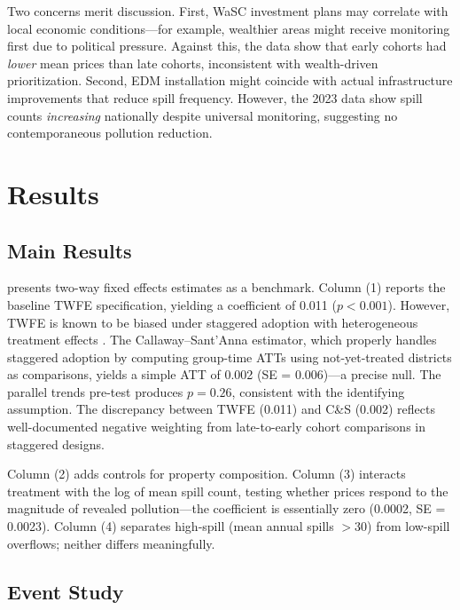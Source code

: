 \documentclass[12pt]{article}
\begin{document}
Two concerns merit discussion. First, WaSC investment plans may correlate with local economic conditions---for example, wealthier areas might receive monitoring first due to political pressure. Against this, the data show that early cohorts had \textit{lower} mean prices than late cohorts, inconsistent with wealth-driven prioritization. Second, EDM installation might coincide with actual infrastructure improvements that reduce spill frequency. However, the 2023 data show spill counts \textit{increasing} nationally despite universal monitoring, suggesting no contemporaneous pollution reduction.


\section{Results}
\label{sec:results}

\subsection{Main Results}



 presents two-way fixed effects estimates as a benchmark. Column (1) reports the baseline TWFE specification, yielding a coefficient of 0.011 ($p < 0.001$). However, TWFE is known to be biased under staggered adoption with heterogeneous treatment effects \citep{goodman-bacon2021}. The Callaway--Sant'Anna estimator, which properly handles staggered adoption by computing group-time ATTs using not-yet-treated districts as comparisons, yields a simple ATT of 0.002 (SE = 0.006)---a precise null. The parallel trends pre-test produces $p = 0.26$, consistent with the identifying assumption. The discrepancy between TWFE (0.011) and C\&S (0.002) reflects well-documented negative weighting from late-to-early cohort comparisons in staggered designs.

Column (2) adds controls for property composition. Column (3) interacts treatment with the log of mean spill count, testing whether prices respond to the magnitude of revealed pollution---the coefficient is essentially zero (0.0002, SE = 0.0023). Column (4) separates high-spill (mean annual spills $>30$) from low-spill overflows; neither differs meaningfully.

\subsection{Event Study}
\end{document}
